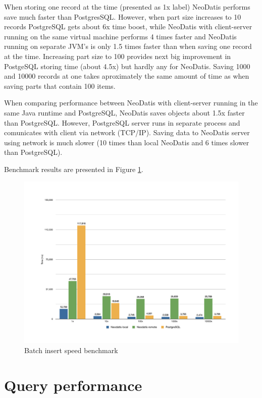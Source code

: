 \documentclass[a4paper,titlepage,12pt]{article}
\begin{document}
When storing one record at the time (presented as 1x label) NeoDatis performs save much faster than PostgresSQL. However, when part size increases to 10 records PostgreSQL gets about 6x time boost, while NeoDatis with client-server running on the same virtual machine performs 4 times faster and NeoDatis running on separate JVM's is only 1.5 times faster than when saving one record at the time. Increasing part size to 100 provides next big improvement in PostgeSQL storing time (about 4.5x) but hardly any for NeoDatis.
Saving 1000 and 10000 records at one takes aproximately the same amount of time as when saving parts that contain 100 items.

When comparing performance between NeoDatis with client-server running in the same Java runtime and PostgreSQL, NeoDatis saves objects about 1.5x faster than PostgreSQL. However, PostgreSQL server runs in separate process and comunicates with client via network (TCP/IP). Saving data to NeoDatis server using network is much slower (10 times than local NeoDatis and 6 times slower than PostgreSQL).

Benchmark results are presented in Figure \ref{fig:batch_insert}.


\begin{landscape}
    \begin{figure}[p]
        \includegraphics[scale=0.6]{Fig1.pdf}
        \caption{Batch insert speed benchmark}
        \label{fig:batch_insert}
    \end{figure}
\end{landscape}

\section{Query performance}\label{sec:query_performance}
\end{document}
